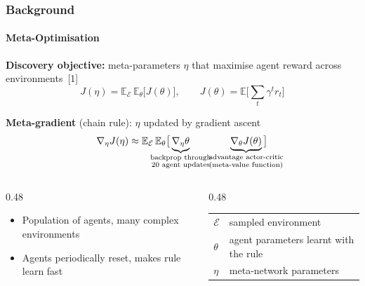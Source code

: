 
\begin{frame}
	\frametitle{Background}
	\framesubtitle{Meta-Optimisation}

	\textbf{Discovery objective:} meta-parameters $\eta$ that maximise agent reward across environments~[1]
	\[
		J(\eta) = \mathbb{E}_{\mathcal{E}}\,\mathbb{E}_{\theta}\big[J(\theta)\big],
		\qquad
		J(\theta) = \mathbb{E}\Big[\textstyle\sum_t \gamma^t r_t\Big]
	\]

	\textbf{Meta-gradient} (chain rule): $\eta$ updated by gradient ascent
	\[
		\nabla_\eta J(\eta) \approx \mathbb{E}_{\mathcal{E}}\,\mathbb{E}_{\theta}\big[
			\underbrace{\nabla_\eta \theta}_{\mathclap{\substack{\text{backprop through}\\\text{20 agent updates}}}}
			\qquad\qquad
			\underbrace{\nabla_\theta J(\theta)}_{\mathclap{\substack{\text{advantage actor-critic}\\\text{(meta-value function)}}}}
		\big]
	\]

	\vfill
	\footnotesize
	\begin{columns}[T]
		\begin{column}{0.48\linewidth}
			\begin{itemize}
				\item Population of agents, many complex environments
				\item Agents periodically reset, makes rule learn fast
			\end{itemize}
		\end{column}
		\begin{column}{0.48\linewidth}
			\begin{tabular}{@{}l@{\quad}l@{}}
				$\mathcal{E}$ & sampled environment \\
				$\theta$ & agent parameters learnt with the rule \\
				$\eta$ & meta-network parameters \\
			\end{tabular}
		\end{column}
	\end{columns}
\end{frame}
